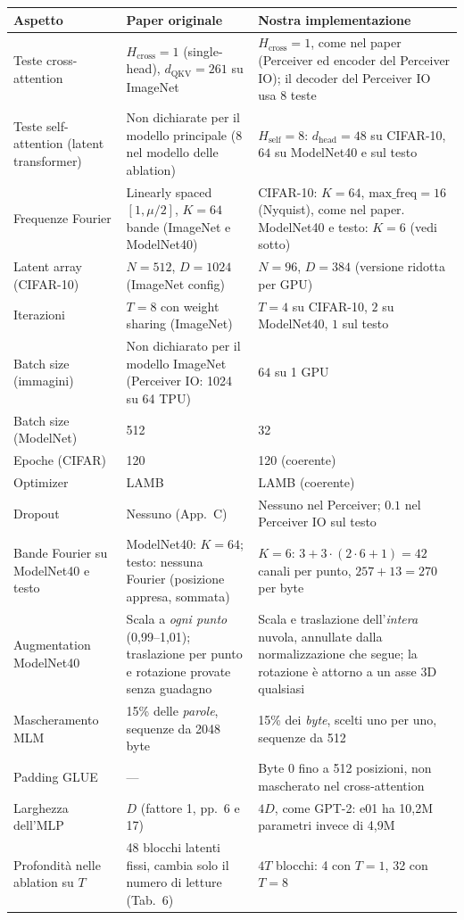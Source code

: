 \documentclass[
  11pt,
]{article}
\begin{document}
\begin{center}
{\small
\begin{tabular}{@{}p{4cm}p{5cm}p{5cm}@{}}
\toprule
\textbf{Aspetto} & \textbf{Paper originale} & \textbf{Nostra implementazione} \\
\midrule
Teste cross-attention & $H_{\text{cross}} = 1$ (single-head), $d_{\text{QKV}} = 261$ su ImageNet & $H_{\text{cross}} = 1$, come nel paper (Perceiver ed encoder del Perceiver IO); il decoder del Perceiver IO usa 8 teste \\
Teste self-attention (latent transformer) & Non dichiarate per il modello principale (8 nel modello delle ablation) & $H_{\text{self}} = 8$: $d_{\text{head}} = 48$ su CIFAR-10, $64$ su ModelNet40 e sul testo \\
Frequenze Fourier & Linearly spaced $[1, \mu/2]$, $K=64$ bande (ImageNet e ModelNet40) & CIFAR-10: $K=64$, $\text{max\_freq}=16$ (Nyquist), come nel paper. ModelNet40 e testo: $K=6$ (vedi sotto) \\
Latent array (CIFAR-10) & $N=512$, $D=1024$ (ImageNet config) & $N=96$, $D=384$ (versione ridotta per GPU) \\
Iterazioni & $T=8$ con weight sharing (ImageNet) & $T=4$ su CIFAR-10, $2$ su ModelNet40, $1$ sul testo \\
Batch size (immagini) & Non dichiarato per il modello ImageNet (Perceiver IO: 1024 su 64 TPU) & $64$ su 1 GPU \\
Batch size (ModelNet) & 512 & 32 \\
Epoche (CIFAR) & 120 & 120 (coerente) \\
Optimizer & LAMB & LAMB (coerente) \\
Dropout & Nessuno (App.\ C) & Nessuno nel Perceiver; $0.1$ nel Perceiver IO sul testo \\
\midrule
Bande Fourier su ModelNet40 e testo & ModelNet40: $K=64$; testo: nessuna Fourier (posizione appresa, sommata) & $K=6$: $3 + 3\cdot(2\cdot 6+1) = 42$ canali per punto, $257 + 13 = 270$ per byte \\
Augmentation ModelNet40 & Scala a \emph{ogni punto} (0,99--1,01); traslazione per punto e rotazione provate senza guadagno & Scala e traslazione dell'\emph{intera} nuvola, annullate dalla normalizzazione che segue; la rotazione è attorno a un asse 3D qualsiasi \\
Mascheramento MLM & 15\% delle \emph{parole}, sequenze da 2048 byte & 15\% dei \emph{byte}, scelti uno per uno, sequenze da 512 \\
Padding GLUE & --- & Byte 0 fino a 512 posizioni, non mascherato nel cross-attention \\
Larghezza dell'MLP & $D$ (fattore 1, pp.~6 e 17) & $4D$, come GPT-2: e01 ha 10{,}2M parametri invece di 4{,}9M \\
Profondità nelle ablation su $T$ & 48 blocchi latenti fissi, cambia solo il numero di letture (Tab.~6) & $4T$ blocchi: 4 con $T=1$, 32 con $T=8$ \\
\bottomrule
\end{tabular}
}
\end{center}
\end{document}
